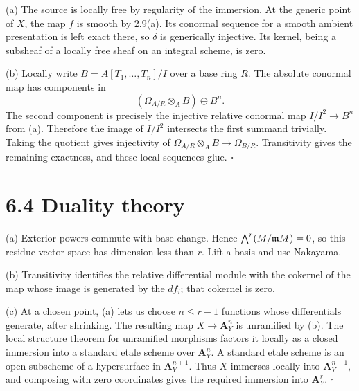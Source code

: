 \documentclass[11pt]{article}
\let\chapterexercise\exercise
\renewcommand{\exercise}[2]{\Needspace{8\baselineskip}\chapterexercise{#1}{#2}}
\begin{document}
\pf
(a) The source is locally free by regularity of the immersion. At the generic point of $X$, the map $f$ is smooth by 2.9(a). Its conormal sequence for a smooth ambient presentation is left exact there, so $\delta$ is generically injective. Its kernel, being a subsheaf of a locally free sheaf on an integral scheme, is zero.

(b) Locally write $B=A[T_1,\ldots,T_n]/I$ over a base ring $R$. The absolute conormal map has components in
\[ (\Omega_{A/R}\otimes_AB)\oplus B^n. \]
The second component is precisely the injective relative conormal map $I/I^2\to B^n$ from (a). Therefore the image of $I/I^2$ intersects the first summand trivially. Taking the quotient gives injectivity of $\Omega_{A/R}\otimes_AB\to\Omega_{B/R}$. Transitivity gives the remaining exactness, and these local sequences glue. \hfill$\square$

\section*{6.4 Duality theory}

\pf
(a) Exterior powers commute with base change. Hence $\bigwedge^r(M/\mathfrak m M)=0$, so this residue vector space has dimension less than $r$. Lift a basis and use Nakayama.

(b) Transitivity identifies the relative differential module with the cokernel of the map whose image is generated by the $df_i$; that cokernel is zero.

(c) At a chosen point, (a) lets us choose $n\le r-1$ functions whose differentials generate, after shrinking. The resulting map $X\to\mathbf A^n_Y$ is unramified by (b). The local structure theorem for unramified morphisms factors it locally as a closed immersion into a standard etale scheme over $\mathbf A^n_Y$. A standard etale scheme is an open subscheme of a hypersurface in $\mathbf A^{n+1}_Y$. Thus $X$ immerses locally into $\mathbf A^{n+1}_Y$, and composing with zero coordinates gives the required immersion into $\mathbf A^r_Y$. \hfill$\square$
\end{document}
